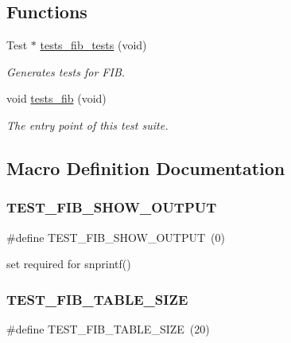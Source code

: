 \subsection*{Functions}
\begin{DoxyCompactItemize}
\item 
Test $\ast$ \hyperlink{group__unittests_gab8c38a5edf2b7ff93e1282d7c1cdb0ef}{tests\+\_\+fib\+\_\+tests} (void)
\begin{DoxyCompactList}\small\item\em Generates tests for F\+IB. \end{DoxyCompactList}\item 
void \hyperlink{group__unittests_ga278497a70466c93676af8839dbcfe05a}{tests\+\_\+fib} (void)
\begin{DoxyCompactList}\small\item\em The entry point of this test suite. \end{DoxyCompactList}\end{DoxyCompactItemize}


\subsection{Macro Definition Documentation}
\mbox{\label{tests-fib_8c_ad13f12e2f5d18b92e39a9b200a6fb30b}} 
\subsubsection{\texorpdfstring{T\+E\+S\+T\+\_\+\+F\+I\+B\+\_\+\+S\+H\+O\+W\+\_\+\+O\+U\+T\+P\+UT}{TEST\_FIB\_SHOW\_OUTPUT}}
{\footnotesize\ttfamily \#define T\+E\+S\+T\+\_\+\+F\+I\+B\+\_\+\+S\+H\+O\+W\+\_\+\+O\+U\+T\+P\+UT~(0)}

set required for snprintf() \mbox{\label{tests-fib_8c_a441999bccd0b9df67ec5bc80f88c9431}} 
\subsubsection{\texorpdfstring{T\+E\+S\+T\+\_\+\+F\+I\+B\+\_\+\+T\+A\+B\+L\+E\+\_\+\+S\+I\+ZE}{TEST\_FIB\_TABLE\_SIZE}}
{\footnotesize\ttfamily \#define T\+E\+S\+T\+\_\+\+F\+I\+B\+\_\+\+T\+A\+B\+L\+E\+\_\+\+S\+I\+ZE~(20)}

